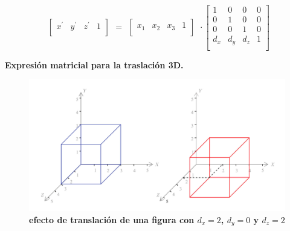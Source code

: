\begin{equation}
\begin{array}{rccl}
\left[
\begin{array}{rccl}
{x}^{\prime} & {y}^{\prime} & {z}^{\prime} & 1\\
\end{array}
\right]
\end{array}
=
\begin{array}{rccl}
\left[
\begin{array}{rccl}
x_{1} & x_{2} & x_{3} & 1\\
\end{array}
\right]
\end{array} 
\cdot
\left[
\begin{array}{rccl}
1 & 0 & 0 & 0\\
0 & 1 & 0 & 0\\
0 & 0 & 1 & 0\\
d_{x} & d_{y} & d_{z} & 1\\
\end{array}
\right]
\end{equation}

\begin{center}
\textbf{\footnotesize{Expresión matricial para la traslación 3D.}}
\end{center}

\begin{center}
\begin{figure}[h]
\includegraphics[width=12cm]{Img/GEO/geo-traslacion0.jpg}
\centering
\caption{\textbf{\footnotesize{efecto de translación de una figura con $d_x=2$, $d_y=0$ y $d_z=2$}}}
\end{figure}
\end{center}

